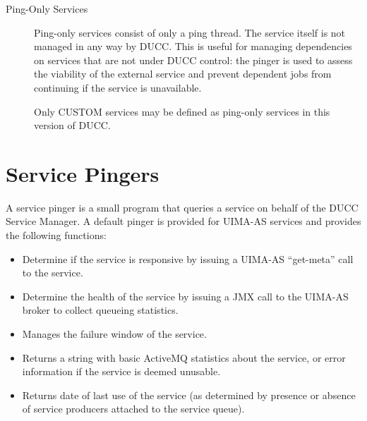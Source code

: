 \begin{description}
        \item[Ping-Only Services] 
          \label{subsub:services.ping-only}
          Ping-only services consist of only
          a ping thread.  The service itself is not managed in any way by DUCC.  This is useful for
          managing dependencies on services that are not under DUCC control: the pinger is used
          to assess the viability of the external service and prevent dependent jobs from
          continuing if the service is unavailable.

          Only CUSTOM services may be defined as ping-only services in this version of DUCC.

      \end{description}

      \section{Service Pingers}
      \label{sec:service.pingers}
      A service pinger is a small program that queries a service on behalf of the DUCC Service
      Manager.  A default pinger is provided for UIMA-AS services and provides the following
      functions:
      \begin{itemize}
        \item Determine if the service is responsive by issuing a UIMA-AS ``get-meta'' call 
          to the service.
        \item Determine the health of the service by issuing a JMX call to the UIMA-AS broker
          to collect queueing statistics.
        \item Manages the failure window of the service.
        \item Returns a string with basic ActiveMQ statistics about the service, or
          error information if the service is deemed unusable.
        \item Returns date of last use of the service (as determined by presence or
          absence of service producers attached to the service queue).
      \end{itemize}

